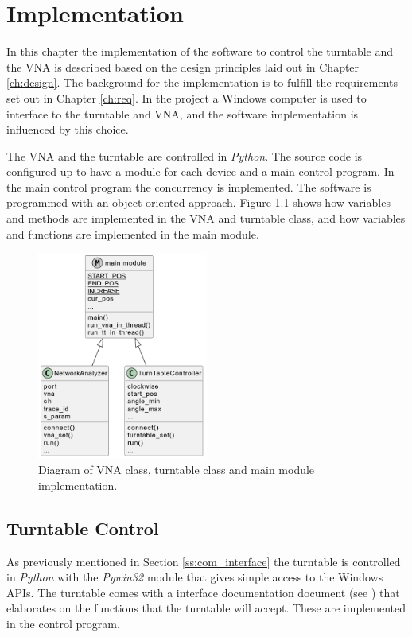 \chapter{Implementation} \label{ch:implementation}
In this chapter the implementation of the software to control the turntable and the VNA is described based on the design principles laid out in Chapter \ref{ch:design}. The background for the implementation is to fulfill the requirements set out in Chapter \ref{ch:req}. In the project a Windows computer is used to interface to the turntable and VNA, and the software implementation is influenced by this choice. 

The VNA and the turntable are controlled in \textit{Python}. The source code is configured up to have a module for each device and a main control program. In the main control program the concurrency is implemented. The software is programmed with an object-oriented approach. Figure \ref{fig:implementation} shows how variables and  methods are implemented in the VNA and turntable class, and how variables and functions are implemented in the main module.
\begin{figure}[H]
    \centering
    \includegraphics[width=0.5\textwidth]{figures/implementation.png}
    \caption{Diagram of VNA class, turntable class and main module implementation.} \label{fig:implementation}
\end{figure}

\section{Turntable Control}
As previously mentioned in Section \ref{ss:com_interface} the turntable is controlled in \textit{Python} with the \textit{Pywin32} module that gives simple access to the Windows APIs. The turntable comes with a interface documentation document (see \cite{hrt_control_api_manual}) that elaborates on the functions that the turntable will accept. These are implemented in the control program. 

